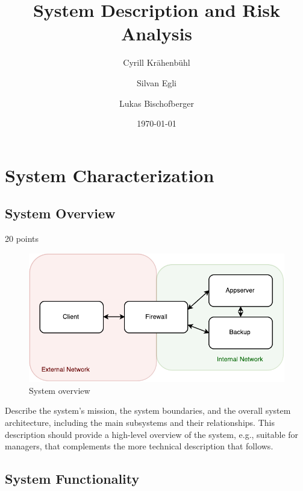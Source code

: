 \documentclass[english]{article}
\title{\huge\sffamily\bfseries System Description and Risk Analysis}
\author{Cyrill Kr\"ahenb\"uhl \and Silvan Egli \and Lukas Bischofberger}
\date{\today}
\begin{document}
\maketitle


\tableofcontents
\pagebreak


\section{System Characterization}

\subsection{System Overview}

20 points

\begin{figure}[ht]
	\centering
	\includegraphics[scale=0.7]{systemoverview.pdf}
	\caption{System overview}
	\label{figure:systemoverview}
\end{figure}

Describe the system's mission,  the system boundaries,
and the overall system architecture, including the main subsystems and
their relationships.   This description should provide a high-level
overview of the system, e.g., suitable for managers, that complements
the more technical description that follows.


\subsection{System Functionality}
\end{document}
